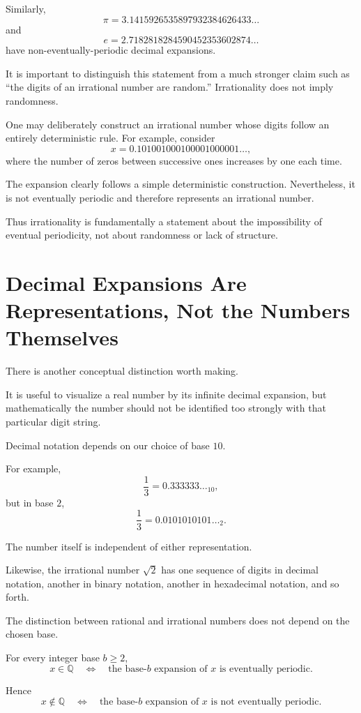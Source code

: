\documentclass{essay}
\begin{document}
Similarly,
\[ \pi = 3.1415926535897932384626433\ldots \]
and
\[ e = 2.7182818284590452353602874\ldots \]
have non-eventually-periodic decimal expansions.

It is important to distinguish this statement from a much stronger claim such as ``the digits of an irrational number are random.'' Irrationality does not imply randomness.

One may deliberately construct an irrational number whose digits follow an entirely deterministic rule. For example, consider
\[ x = 0.101001000100001000001\ldots, \]
where the number of zeros between successive ones increases by one each time.

The expansion clearly follows a simple deterministic construction. Nevertheless, it is not eventually periodic and therefore represents an irrational number.

Thus irrationality is fundamentally a statement about the impossibility of eventual periodicity, not about randomness or lack of structure.

\section{Decimal Expansions Are Representations, Not the Numbers Themselves}

There is another conceptual distinction worth making.

It is useful to visualize a real number by its infinite decimal expansion, but mathematically the number should not be identified too strongly with that particular digit string.

Decimal notation depends on our choice of base \(10\).

For example,
\[ \frac{1}{3} = 0.333333\ldots_{10}, \]
but in base \(2\),
\[ \frac{1}{3} = 0.0101010101\ldots_{2}. \]

The number itself is independent of either representation.

Likewise, the irrational number \(\sqrt{2}\) has one sequence of digits in decimal notation, another in binary notation, another in hexadecimal notation, and so forth.

The distinction between rational and irrational numbers does not depend on the chosen base.

For every integer base \(b\geq2\),
\[
  x\in\mathbb{Q}
  \quad\Longleftrightarrow\quad
  \text{the base-\(b\) expansion of \(x\) is eventually periodic}.
\]

Hence
\[
  x\notin\mathbb{Q}
  \quad\Longleftrightarrow\quad
  \text{the base-\(b\) expansion of \(x\) is not eventually periodic}.
\]
\end{document}
